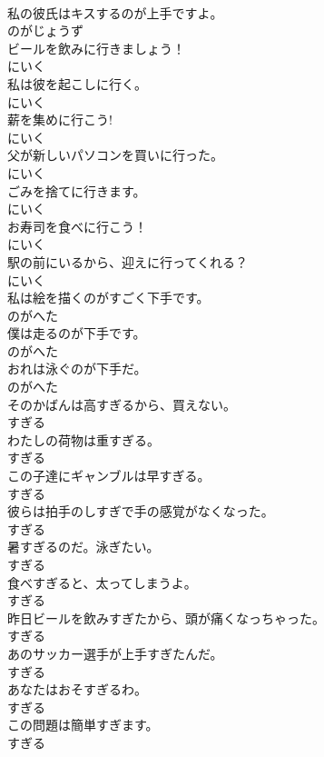 \documentclass[8pt]{extreport}
\begin{document}
\begin{CJK}{UTF8}{min}
\\	私の彼氏はキスするのが上手ですよ。	
\\	のがじょうず
\\	ビールを飲みに行きましょう！	
\\	にいく
\\	私は彼を起こしに行く。	
\\	にいく
\\	薪を集めに行こう!	
\\	にいく
\\	父が新しいパソコンを買いに行った。	
\\	にいく
\\	ごみを捨てに行きます。	
\\	にいく
\\	お寿司を食べに行こう！	
\\	にいく
\\	駅の前にいるから、迎えに行ってくれる？	
\\	にいく
\\	私は絵を描くのがすごく下手です。	
\\	のがへた
\\	僕は走るのが下手です。	
\\	のがへた
\\	おれは泳ぐのが下手だ。	
\\	のがへた
\\	そのかばんは高すぎるから、買えない。	
\\	すぎる
\\	わたしの荷物は重すぎる。	
\\	すぎる
\\	この子達にギャンブルは早すぎる。	
\\	すぎる
\\	彼らは拍手のしすぎで手の感覚がなくなった。	
\\	すぎる
\\	暑すぎるのだ。泳ぎたい。	
\\	すぎる
\\	食べすぎると、太ってしまうよ。	
\\	すぎる
\\	昨日ビールを飲みすぎたから、頭が痛くなっちゃった。	
\\	すぎる
\\	あのサッカー選手が上手すぎたんだ。	
\\	すぎる
\\	あなたはおそすぎるわ。	
\\	すぎる
\\	この問題は簡単すぎます。	
\\	すぎる

\end{CJK}
\end{document}
